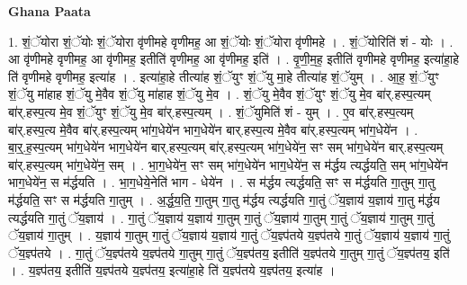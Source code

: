 \documentclass[17pt]{extarticle}
\begin{document}
\textbf{Ghana Paata } \newline

1. शं॒ॅयोरा शं॒ॅयोः शं॒ॅयोरा वृ॑णीमहे वृणीमह॒ आ शं॒ॅयोः शं॒ॅयोरा वृ॑णीमहे । . शं॒ॅयोरिति॑ शं - योः । . आ वृ॑णीमहे वृणीमह॒ आ वृ॑णीमह॒ इतीति॑ वृणीमह॒ आ वृ॑णीमह॒ इति॑ । . वृ॒णी॒म॒ह॒ इतीति॑ वृणीमहे वृणीमह॒ इत्या॑हा॒हे ति॑ वृणीमहे वृणीमह॒ इत्या॑ह । . इत्या॑हा॒हे तीत्या॑ह शं॒ॅयुꣳ शं॒ॅयु मा॒हे तीत्या॑ह शं॒ॅयुम् । . आ॒ह॒ शं॒ॅयुꣳ शं॒ॅयु मा॑हाह शं॒ॅयु मे॒वैव शं॒ॅयु मा॑हाह शं॒ॅयु मे॒व । . शं॒ॅयु मे॒वैव शं॒ॅयुꣳ शं॒ॅयु मे॒व बा॑र्.हस्प॒त्यम् बा॑र्.हस्प॒त्य मे॒व शं॒ॅयुꣳ शं॒ॅयु मे॒व बा॑र्.हस्प॒त्यम् । . शं॒ॅयुमिति॑ शं - युम् । . ए॒व बा॑र्.हस्प॒त्यम् बा॑र्.हस्प॒त्य मे॒वैव बा॑र्.हस्प॒त्यम् भा॑ग॒धेये॑न भाग॒धेये॑न बार्.हस्प॒त्य मे॒वैव बा॑र्.हस्प॒त्यम् भा॑ग॒धेये॑न । . बा॒र्॒.ह॒स्प॒त्यम् भा॑ग॒धेये॑न भाग॒धेये॑न बार्.हस्प॒त्यम् बा॑र्.हस्प॒त्यम् भा॑ग॒धेये॑न॒ सꣳ सम् भा॑ग॒धेये॑न बार्.हस्प॒त्यम् बा॑र्.हस्प॒त्यम् भा॑ग॒धेये॑न॒ सम् । . भा॒ग॒धेये॑न॒ सꣳ सम् भा॑ग॒धेये॑न भाग॒धेये॑न॒ स म॑र्द्धय त्यर्द्धयति॒ सम् भा॑ग॒धेये॑न भाग॒धेये॑न॒ स म॑र्द्धयति । . भा॒ग॒धेये॒नेति॑ भाग - धेये॑न । . स म॑र्द्धय त्यर्द्धयति॒ सꣳ स म॑र्द्धयति गा॒तुम् गा॒तु म॑र्द्धयति॒ सꣳ स म॑र्द्धयति गा॒तुम् । . अ॒र्द्ध॒य॒ति॒ गा॒तुम् गा॒तु म॑र्द्धय त्यर्द्धयति गा॒तुं ॅय॒ज्ञाय॑ य॒ज्ञाय॑ गा॒तु म॑र्द्धय त्यर्द्धयति गा॒तुं ॅय॒ज्ञाय॑ । . गा॒तुं ॅय॒ज्ञाय॑ य॒ज्ञाय॑ गा॒तुम् गा॒तुं ॅय॒ज्ञाय॑ गा॒तुम् गा॒तुं ॅय॒ज्ञाय॑ गा॒तुम् गा॒तुं ॅय॒ज्ञाय॑ गा॒तुम् । . य॒ज्ञाय॑ गा॒तुम् गा॒तुं ॅय॒ज्ञाय॑ य॒ज्ञाय॑ गा॒तुं ॅय॒ज्ञ्प॑तये य॒ज्ञ्प॑तये गा॒तुं ॅय॒ज्ञाय॑ य॒ज्ञाय॑ गा॒तुं ॅय॒ज्ञ्प॑तये । . गा॒तुं ॅय॒ज्ञ्प॑तये य॒ज्ञ्प॑तये गा॒तुम् गा॒तुं ॅय॒ज्ञ्प॑तय॒ इतीति॑ य॒ज्ञ्प॑तये गा॒तुम् गा॒तुं ॅय॒ज्ञ्प॑तय॒ इति॑ । . य॒ज्ञ्प॑तय॒ इतीति॑ य॒ज्ञ्प॑तये य॒ज्ञ्प॑तय॒ इत्या॑हा॒हे ति॑ य॒ज्ञ्प॑तये य॒ज्ञ्प॑तय॒ इत्या॑ह । \newline
\end{document}
